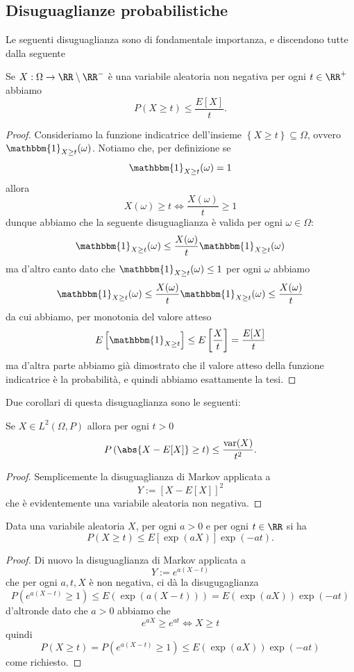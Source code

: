 \documentclass[11pt]{scrartcl}
\begin{document}
	\subsection{Disuguaglianze probabilistiche}
	Le seguenti disuguaglianza sono di fondamentale importanza, e discendono tutte dalla seguente
	\begin{theorem}
		Se $X:\Omega\to \RR\setminus\RR^-$ è una variabile aleatoria non negativa per ogni $t\in \RR^+$ abbiamo
		$$P\left(X\ge t\right)\le \frac{E[X]}{t}.$$
	\end{theorem}
	\begin{proof}
		Consideriamo la funzione indicatrice dell'insieme $\left\{X\ge t\right\}\subseteq \Omega$, ovvero $\mathbbm{1}_{X\ge t}(\omega)$. Notiamo che, per definizione se $$\mathbbm{1}_{X\ge t}(\omega)=1$$
		allora 
		$$X(\omega)\ge t \iff \frac{X(\omega)}{t}\ge 1$$
		dunque abbiamo che la seguente disuguaglianza è valida per ogni $\omega\in\Omega$:
		$$\mathbbm{1}_{X\ge t}(\omega)\le \frac{X(\omega)}{t}\mathbbm{1}_{X\ge t}(\omega)$$
		ma d'altro canto dato che $\mathbbm{1}_{X\ge t}(\omega)\le 1$ per ogni $\omega$ abbiamo
		$$\mathbbm{1}_{X\ge t}(\omega)\le \frac{X(\omega)}{t}\mathbbm{1}_{X\ge t}(\omega)\le \frac{X(\omega)}{t}$$
		da cui abbiamo, per monotonia del valore atteso
		$$E\left[\mathbbm{1}_{X\ge t}\right]\le E\left[\frac{X}{t}\right]=\frac{E[X]}{t}$$
		ma d'altra parte abbiamo già dimostrato che il valore atteso della funzione indicatrice è la probabilità, e quindi abbiamo esattamente la tesi.
	\end{proof}
	Due corollari di questa disuguaglianza sono le seguenti:
	\begin{corollary}
		Se $X\in L^2(\Omega,P)$ allora per ogni $t>0$ 
		$$P\left(\abs{X-E[X]}\ge t\right)\le \frac{\text{var}(X)}{t^2}.$$
	\end{corollary}
	\begin{proof}
		Semplicemente la disuguaglianza di Markov applicata a 
		$$Y:=\left[X-E[X]\right]^2$$
		che è evidentemente una variabile aleatoria non negativa.
	\end{proof}
	\begin{corollary}
		Data una variabile aleatoria $X$, per ogni $a>0$ e per ogni $t\in\RR$ si ha
		$$P(X\ge t)\le E\left[\exp(aX)\right]\exp\left(-at\right).$$
	\end{corollary}
	\begin{proof}
		Di nuovo la disuguaglianza di Markov applicata a 
		$$Y:=e^{a(X-t)}$$
		che per ogni $a,t,X$ è non negativa, ci dà la disugugaglianza
		$$P\left(e^{a(X-t)}\ge 1\right)\le E\left(\exp\left(a(X-t)\right)\right)=E\left(\exp(aX)\right)\exp\left(-at\right)$$
		d'altronde dato che $a>0$ abbiamo che 
		$$e^{aX}\ge e^{at} \iff X\ge t$$
		quindi
		$$P\left(X\ge t\right)=P\left(e^{a(X-t)}\ge 1\right)\le E\left(\exp(aX)\right)\exp\left(-at\right)$$
		come richiesto.
	\end{proof}
\end{document}
